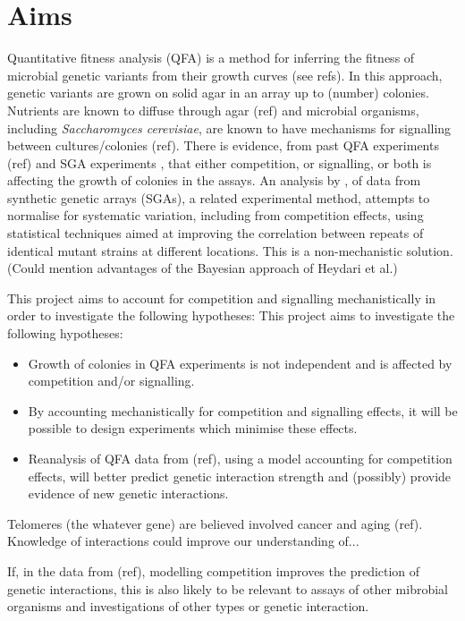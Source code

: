 
\section{Aims}
\label{sec:aims}


Quantitative fitness analysis (QFA) is a method for inferring the
fitness of microbial genetic variants from their growth curves (see
refs). In this approach, genetic variants are grown on solid agar in
an array up to (number) colonies. Nutrients are known to diffuse
through agar (ref) and microbial organisms, including
\textit{Saccharomyces cerevisiae}, are known to have mechanisms for
signalling between cultures/colonies (ref). There is evidence, from
past QFA experiments (ref) and SGA experiments
\citep{Baryshnikova2010}, that either competition, or signalling, or
both is affecting the growth of colonies in the assays. An analysis by
\citet{Baryshnikova2010}, of data from synthetic genetic arrays
(SGAs), a related experimental method, attempts to normalise for
systematic variation, including from competition effects, using
statistical techniques aimed at improving the correlation between
repeats of identical mutant strains at different locations. This is a
non-mechanistic solution. (Could mention advantages of the Bayesian
approach of Heydari et al.)

This project aims to account for competition and signalling
mechanistically in order to investigate the following hypotheses:
This project aims to investigate the following hypotheses:
\begin{itemize}
\item Growth of colonies in QFA experiments is not independent and is
  affected by competition and/or signalling.
\item By accounting mechanistically for competition and signalling effects, it
  will be possible to design experiments which minimise these effects.
\item Reanalysis of QFA data from (ref), using a model accounting for
  competition effects, will better predict genetic interaction
  strength and (possibly) provide evidence of new genetic interactions.
\end{itemize}


Telomeres (the whatever gene) are believed involved cancer and aging
(ref). Knowledge of interactions could improve our understanding of...

If, in the data from (ref), modelling competition improves the
prediction of genetic interactions, this is also likely to be relevant
to assays of other mibrobial organisms and investigations of other
types or genetic interaction.


